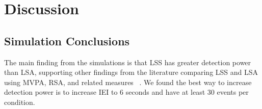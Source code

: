 \documentclass[10pt,letterpaper]{article}
\begin{document}





\section*{Discussion}
\label{discussion}

\subsection*{Simulation Conclusions}
\label{discussion:simulation-conclusions}

The main finding from the simulations is that LSS has greater detection power than LSA,
supporting other findings from the literature comparing LSS and LSA using MVPA, RSA,
and related measures ~\cite{Mumford2012,Mumford2014a,Abdulrahman2016,Turner2012a}.
We found the best way to increase detection power is to increase IEI to 6 seconds and
have at least 30 events per condition.
\end{document}
